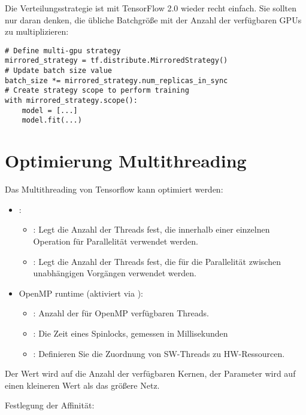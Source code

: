 Die Verteilungsstrategie ist mit TensorFlow 2.0 wieder recht einfach. Sie sollten nur daran denken, 
die übliche Batchgröße mit der Anzahl der verfügbaren GPUs zu multiplizieren:

\begin{verbatim}
# Define multi-gpu strategy 
mirrored_strategy = tf.distribute.MirroredStrategy()
# Update batch size value
batch_size *= mirrored_strategy.num_replicas_in_sync
# Create strategy scope to perform training
with mirrored_strategy.scope():
    model = [...]
    model.fit(...)
\end{verbatim}

\section{Optimierung Multithreading}


Das Multithreading von Tensorflow kann optimiert werden:

\begin{itemize}
	\item {}:
	\begin{itemize}
		\item {}: Legt die Anzahl der Threads fest, 
		die innerhalb einer einzelnen Operation für Parallelität verwendet werden.
		\item {}: Legt die Anzahl der Threads fest, 
		die für die Parallelität zwischen unabhängigen Vorgängen verwendet werden.
	\end{itemize}
	\item OpenMP runtime (aktiviert via ):
	\begin{itemize}
		\item {}: Anzahl der für OpenMP verfügbaren Threads.
		\item {}: Die Zeit eines Spinlocks, gemessen in Millisekunden
		\item {}: Definieren Sie die Zuordnung von SW-Threads zu HW-Ressourcen.
	\end{itemize}
\end{itemize}




Der Wert  wird auf die Anzahl der verfügbaren Kernen,
der Parameter  wird auf einen kleineren Wert als das
größere Netz.

\bigskip

Festlegung der Affinität:


\bigskip


